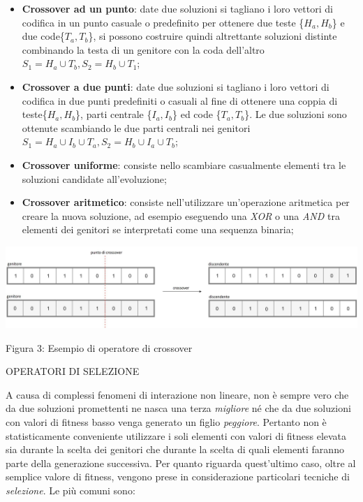 \documentclass[11pt]{article}
\begin{document}
\begin{itemize}
    \item \textbf{Crossover ad un punto}: date due soluzioni si tagliano i loro vettori di codifica in un punto casuale o predefinito per ottenere due teste \{$H_a, H_b$\} e due code\{$T_a, T_b$\}, si possono costruire quindi altrettante soluzioni distinte combinando la testa di un genitore con la coda dell'altro $S_1 = H_a \cup T_b , S_2 = H_b \cup T_1$;
    
    \item \textbf{Crossover a due punti}: date due soluzioni si tagliano i loro vettori di codifica in due punti predefiniti o casuali al fine di ottenere una coppia di teste\{$H_a, H_b$\}, parti centrale \{$I_a, I_b$\} ed code \{$T_a, T_b$\}. Le due soluzioni sono ottenute scambiando le due parti centrali nei genitori $S_1 = H_a \cup I_b \cup T_a , S_2 = H_b \cup I_a \cup T_b$;
    
    \item \textbf{Crossover uniforme}: consiste nello scambiare casualmente elementi tra le soluzioni candidate all'evoluzione;
    
    \item \textbf{Crossover aritmetico}: consiste nell'utilizzare un'operazione aritmetica per creare la nuova soluzione, ad esempio eseguendo una \textit{XOR} o una \textit{AND} tra elementi dei genitori se interpretati come una sequenza binaria;
\end{itemize}

\begin{center}
    \includegraphics[scale=0.5]{selezioneSP}
    
    Figura 3: Esempio di operatore di crossover
\end{center}


\vspace{2\baselineskip}
OPERATORI DI SELEZIONE
\vspace{2\baselineskip}

A causa di complessi fenomeni di interazione non lineare, non è sempre vero che da due soluzioni promettenti ne nasca una terza \textit{migliore} né che da due soluzioni con valori di fitness basso venga generato un figlio \textit{peggiore}. Pertanto non è statisticamente conveniente utilizzare i soli elementi con valori di fitness elevata sia durante la scelta dei genitori che durante la scelta di quali elementi faranno parte della generazione successiva. Per quanto riguarda quest'ultimo caso, oltre al semplice valore di fitness, vengono prese in considerazione particolari tecniche di \textit{selezione}. Le più comuni sono:
\end{document}
